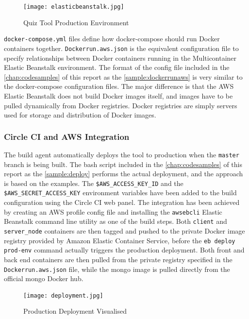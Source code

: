 \begin{figure}[h!]
    \centering
    \texttt{[image: elasticbeanstalk.jpg]}
    \caption{Quiz Tool Production Environment}
    \label{fig:ebs}
\end{figure}

\texttt{docker-compose.yml} files define how docker-compose should run Docker containers together.
\texttt{Dockerrun.aws.json} is the equivalent configuration file to specify relationships between Docker
containers running in the Multicontainer Elastic Beanstalk environment. The format of the config file
included in the \autoref{chap:codesamples} of this report
as the \autoref{sample:dockerrunaws} is very
similar to the docker-compose configuration files. The major
difference is that the AWS Elastic Beanstalk does not build Docker images itself, and images have
to be pulled dynamically from Docker registries. Docker registries are simply servers used for storage and
distribution of Docker images.

\subsubsection{Circle CI and AWS Integration}
The build agent automatically deploys the tool to production when the \texttt{master}
branch is being built. The bash script included in the \autoref{chap:codesamples} of this report
as the \autoref{sample:deploy} performs the actual deployment, and the
approach is based on the examples\cite{41}\cite{42}.
The \texttt{\$AWS\_ACCESS\_KEY\_ID} and the \texttt{\$AWS\_SECRET\_ACCESS\_KEY} environment
variables have been added to the build configuration using the Circle CI web panel.
The integration has been achieved by creating an AWS profile config file and installing
the \texttt{awsebcli} Elastic Beanstalk command line utility as one of the build steps.
Both \texttt{client} and \texttt{server\_node} containers are then tagged and pushed
to the private Docker image registry provided by Amazon Elastic Container Service, before
the \texttt{eb deploy prod-env} command actually triggers the production deployment.
Both front and back end containers are then pulled from the private registry specified
in the \texttt{Dockerrun.aws.json} file, while the mongo image is pulled directly from
the official mongo Docker hub.

\begin{figure}[h!]
    \centering
    \texttt{[image: deployment.jpg]}
    \caption{Production Deployment Visualised}
    \label{fig:deploymentprocess}
\end{figure}

